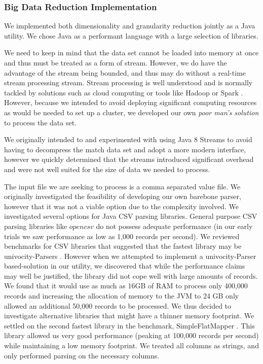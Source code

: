 \subsubsection{Big Data Reduction Implementation} %

We implemented both dimensionality and granularity reduction jointly as a Java utility. We chose Java as a performant language with a large selection of libraries.

We need to keep in mind that the data set cannot be loaded into memory at once and thus must be treated as a form of stream. However, we do have the advantage of the stream being bounded, and thus may do without a real-time stream processing stream. Stream processing is well understood and is normally tackled by solutions such as cloud computing \cite{iyerWhatDrivesBig2013} or tools like Hadoop or Spark \cite{namiotBigDataStream2015}. However, because we intended to avoid deploying significant computing resources as would be needed to set up a cluster, we developed our own \emph{poor man's solution} to process the data set.

We originally intended to and experimented with using Java 8 Streams to avoid having to decompress the match data set and adopt a more modern interface, however we quickly determined that the streams introduced significant overhead and were not well suited for the size of data we needed to process.

The input file we are seeking to process is a comma separated value file. We originally investigated the feasibility of developing our own barebone parser, however that it was not a viable option due to the complexity involved. We investigated several options for Java CSV parsing libraries. General purpose CSV parsing libraries like $opencsv$ \cite{ruckerjonesOpencsv2019} do not possess adequate performance (in our early trials we saw performance as low as 1,000 records per second). We reviewed benchmarks for CSV libraries that suggested that the fastest library may be univocity-Parsers \cite{univocitysoftwareptyltdComparisonsAllJavabased2018}. However when we attempted to implement a univocity-Parser \cite{univocitysoftwareptyltdUniVocityparsers2019} based-solution in our utility, we discovered that while the performance claims may well be justified, the library did not cope well with large amounts of records. We found that it would use as much as 16GB of RAM to process only 400,000 records and increasing the allocation of memory to the JVM to 24 GB only allowed an additional 50,000 records to be processed. We thus decided to investigate alternative libraries that might have a thinner memory footprint. We settled on the second fastest library in the benchmark, SimpleFlatMapper \cite{rogerSimpleFlatMapper2019}. This library allowed us very good performance (peaking at 100,000 records per second) while maintaining a low memory footprint. We treated all columns as strings, and only performed parsing on the necessary columns.

